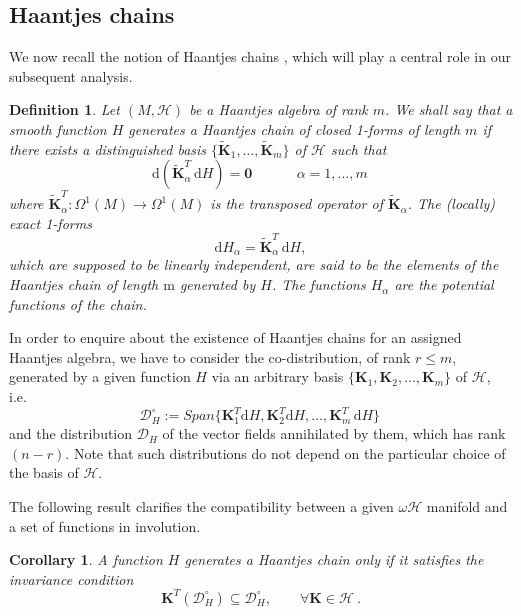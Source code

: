 \documentclass[10pt]{amsart}
\numberwithin{equation}{section}
\newcommand\noi{\noindent}
\newcommand{\rd}{\mathrm{d}}
\newtheorem{definition}{Definition}
\newtheorem{corollary}{Corollary}
\theoremstyle{definition}
\begin{document}
	
	
	
	
	\subsection{Haantjes chains}
	\noi We now recall the notion of Haantjes chains \cite{TT2022AMPA, TTPRE2012}, which will play a central role in our subsequent analysis.
	
	\begin{definition}
		Let $( M,\mathscr{H})$ be a Haantjes algebra of rank $m$. We shall say that a smooth function $H$ generates a Haantjes chain of closed 1-forms of length $m$ if there exists
		a distinguished basis $\{\tilde{\boldsymbol{K}}_1,\ldots, \tilde{\boldsymbol{K}}_m\}$ of $\mathscr{H}$
		such that
		\begin{equation} \label{eq:MHchain}
			\rd (\tilde{\boldsymbol{K}}^T_\alpha \,\rd H )=\boldsymbol{0} \, \quad\qquad \alpha=1,\ldots,m \,
		\end{equation}
		where $\tilde{\boldsymbol{K}}^{T}_{\alpha}: \Omega^{1}(M) \to \Omega^{1}(M)$ is the transposed operator of $\tilde{\boldsymbol{K}}_{\alpha}$. The (locally) exact 1-forms 
		\begin{equation}
			\rd H_\alpha=\tilde{\boldsymbol{K}}^T_\alpha \,\rd H,
		\end{equation}
		which are supposed to be linearly independent, are said to be the elements of the Haantjes chain of length $\mathrm{m}$ generated by $H$. The functions $H_\alpha$ are the potential functions of the chain.
	\end{definition}
	
	
	In order to enquire about the existence of Haantjes chains for an assigned Haantjes algebra, we have to consider the co-distribution, of rank $r\leq m$, generated by a given function $H$ via an arbitrary basis
	$ \{ \boldsymbol{K}_1, \boldsymbol{K}_2,\ldots,\boldsymbol{K}_{m}\} $ of $\mathscr{H}$, i.e.
	\begin{equation} \label{eq:codKH}
		\mathcal{D}_H^\circ:=Span\{ \boldsymbol{K}_1^T \rd H, \boldsymbol{K}_2^T \rd H,\ldots,\boldsymbol{K}_{m}^T\,\rd H\} \,
	\end{equation}
	and the distribution $\mathcal{D}_H$ of the vector fields annihilated by them, which has rank $(n-r)$.
	Note that such distributions do not depend on the particular choice of the basis of $\mathscr{H}$.
	
	The following result clarifies the compatibility between a given $\omega \mathscr{H}$ manifold and a set of functions in involution.
	\begin{corollary}
		A function $H$ generates a Haantjes chain only if it satisfies the invariance condition
		\begin{equation}
			\boldsymbol{K}^T (\mathcal{D}_H^\circ ) \subseteq \mathcal{D}_H^\circ, \qquad\forall \boldsymbol{K} \in \mathscr{H}\ .
		\end{equation}
	\end{corollary}
	
\end{document}
